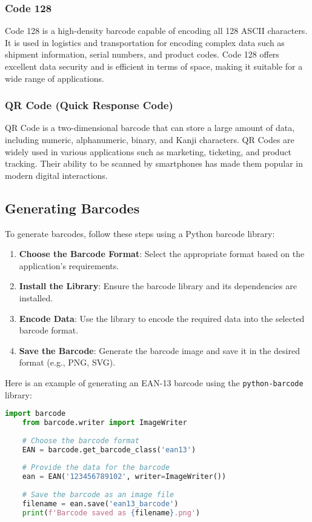 \subsubsection{Code 128}

Code 128 is a high-density barcode capable of encoding all 128 ASCII characters. It is used in logistics and transportation for encoding complex data such as shipment information, serial numbers, and product codes. Code 128 offers excellent data security and is efficient in terms of space, making it suitable for a wide range of applications.

\subsubsection{QR Code (Quick Response Code)}

QR Code is a two-dimensional barcode that can store a large amount of data, including numeric, alphanumeric, binary, and Kanji characters. QR Codes are widely used in various applications such as marketing, ticketing, and product tracking. Their ability to be scanned by smartphones has made them popular in modern digital interactions.\cite{Barrera:2020}

\subsection{Generating Barcodes}

To generate barcodes, follow these steps using a Python barcode library:

\begin{enumerate}
	\item \textbf{Choose the Barcode Format}: Select the appropriate format based on the application's requirements.
	\item \textbf{Install the Library}: Ensure the barcode library and its dependencies are installed.
	\item \textbf{Encode Data}: Use the library to encode the required data into the selected barcode format.
	\item \textbf{Save the Barcode}: Generate the barcode image and save it in the desired format (e.g., PNG, SVG).
\end{enumerate}

Here is an example of generating an EAN-13 barcode using the \texttt{python-barcode} library:

\begin{lstlisting}[language=Python]
	import barcode
	from barcode.writer import ImageWriter
	
	# Choose the barcode format
	EAN = barcode.get_barcode_class('ean13')
	
	# Provide the data for the barcode
	ean = EAN('123456789102', writer=ImageWriter())
	
	# Save the barcode as an image file
	filename = ean.save('ean13_barcode')
	print(f'Barcode saved as {filename}.png')
\end{lstlisting}

